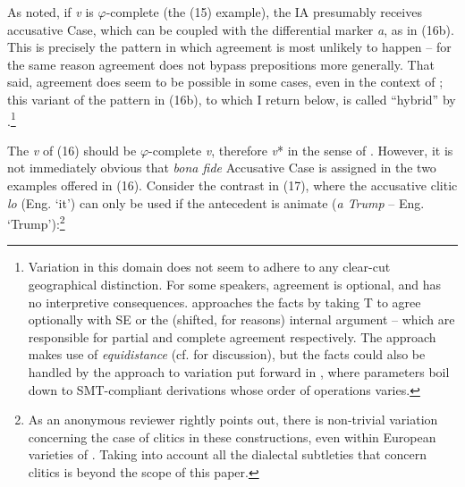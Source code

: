 \documentclass[output=paper]{langsci/langscibook}
\begin{document}
As noted, if \textit{v} is $\varphi $-complete (the (15) example), the IA presumably receives accusative Case, which can be coupled with the differential marker \textit{a}, as in (16b). This is precisely the pattern in which agreement is most unlikely to happen – for the same reason agreement does not bypass prepositions more generally. That said, agreement does seem to be possible in some cases, even in the context of \DOM; this variant of the pattern in (16b), to which I return below, is called “hybrid” by \citet{RAE-ASALE2009}.\footnote{Variation in this domain does not seem to adhere to any clear-cut geographical distinction. For some speakers, agreement is optional, and has no interpretive consequences. \citet{Planells2017} approaches the facts by taking T to agree optionally with SE or the (shifted, for \DOM reasons) internal argument – which are responsible for partial and complete agreement respectively. The approach makes use of  \textit{equidistance} (cf. \citealt{Gallego2013} for discussion), but the facts could also be handled by the approach to variation put forward in \citet{Obata2016}, where parameters boil down to SMT-compliant derivations whose order of operations varies.}

The \textit{v} of (16) should be $\varphi $-complete \textit{v}, therefore \textit{v}* in the sense of \citet{Chomsky2001Derivation}. However, it is not immediately obvious that \textit{bona fide} Accusative Case is assigned in the two examples offered in (16). Consider the contrast in (17), where the accusative clitic \textit{lo} (Eng. ‘it’) can only be used if the antecedent is animate (\textit{a Trump} – Eng. ‘Trump’):\footnote{As an anonymous reviewer rightly points out, there is non-trivial variation concerning the case of clitics in these constructions, even within European varieties of . Taking into account all the dialectal subtleties that concern clitics is beyond the scope of this paper.}

\ea%
    \label{ex:gallego:17}
    \z
\z   
\end{document}
